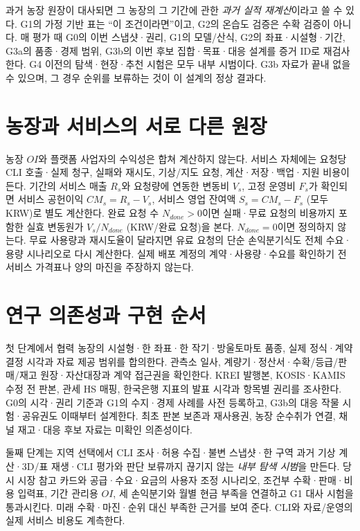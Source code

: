 \documentclass[11pt,a4paper]{article}
\newcommand{\hold}{\textsf{판단 보류}}
\begin{document}
과거 농장 원장이 대사되면 그 농장의 그 기간에 관한 \emph{과거 실적 재계산}이라고 쓸 수 있다. G1의 가정 기반 표는 ``이 조건이라면''이고, G2의 온습도 검증은 수확 검증이 아니다. 매 평가 때 G0의 이번 스냅샷·권리, G1의 모델/산식, G2의 좌표·시설형·기간, G3a의 품종·경제 범위, G3b의 이번 후보 집합·목표·대응 설계를 증거 ID로 재검사한다. G4 이전의 탐색·현장·추천 시험은 모두 내부 시범이다. G3b 자료가 끝내 없을 수 있으며, 그 경우 순위를 보류하는 것이 이 설계의 정상 결과다.

\section{농장과 서비스의 서로 다른 원장}
농장 $OI$와 플랫폼 사업자의 수익성은 합쳐 계산하지 않는다. 서비스 자체에는 요청당 CLI 호출·실제 청구, 실패와 재시도, 기상/지도 요청, 계산·저장·백업·지원 비용이 든다. 기간의 서비스 매출 $R_s$와 요청량에 연동한 변동비 $V_s$, 고정 운영비 $F_s$가 확인되면 서비스 공헌이익 $CM_s=R_s-V_s$, 서비스 영업 잔여액 $S_s=CM_s-F_s$ (모두 KRW)로 별도 계산한다. 완료 요청 수 $N_{done}>0$이면 실패·무료 요청의 비용까지 포함한 실효 변동원가 $V_s/N_{done}$ (KRW/완료 요청)을 본다. $N_{done}=0$이면 정의하지 않는다. 무료 사용량과 재시도율이 달라지면 유료 요청의 단순 손익분기식도 전체 수요·용량 시나리오로 다시 계산한다. 실제 배포 계정의 계약·사용량·수요를 확인하기 전 서비스 가격표나 양의 마진을 주장하지 않는다.

\section{연구 의존성과 구현 순서}
첫 단계에서 협력 농장의 시설형·한 좌표·한 작기·방울토마토 품종, 실제 정식·계약 결정 시각과 자료 제공 범위를 합의한다. 관측소 일사, 계량기·정산서·수확/등급/판매/재고 원장·자산대장과 계약 접근권을 확인한다. KREI 발행본, KOSIS·KAMIS 수정 전 판본, 관세 HS 매핑, 한국은행 지표의 발표 시각과 항목별 권리를 조사한다. G0의 시각·권리 기준과 G1의 수지·경제 사례를 사전 등록하고, G3b의 대응 작물 시험·공유권도 이때부터 설계한다. 최초 판본 보존과 재사용권, 농장 순수취가 연결, 채널 재고·대응 후보 자료는 미확인 의존성이다.

둘째 단계는 지역 선택에서 CLI 조사·허용 수집·불변 스냅샷·한 구역 과거 기상 계산·3D/표 재생·CLI 평가와 \hold 까지 끊기지 않는 \emph{내부 탐색 시범}을 만든다. 당시 시장 참고 카드와 공급·수요·요금의 사용자 조정 시나리오, 조건부 수확·판매·비용 입력표, 기간 관리용 $OI$, 세 손익분기와 월별 현금 부족을 연결하고 G1 대사 시험을 통과시킨다. 미래 수확·마진·순위 대신 부족한 근거를 보여 준다. CLI와 자료/운영의 실제 서비스 비용도 계측한다.
\end{document}
